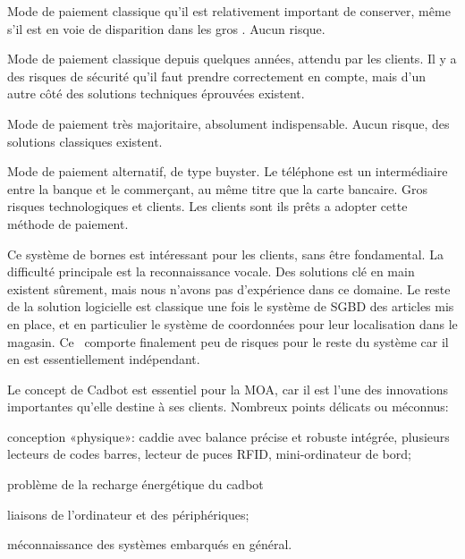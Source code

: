 \startnote
{} Mode de paiement classique qu'il est relativement important de conserver, même s'il est en voie de disparition dans les gros \fm.
 Aucun risque.
\stopnote

\startnote
{} Mode de paiement classique depuis quelques années, attendu par les clients.
 Il y a des risques de sécurité qu'il faut prendre correctement en compte, mais d'un autre côté des solutions techniques éprouvées existent.
\stopnote

\startnote
{} Mode de paiement très majoritaire, absolument indispensable.
 Aucun risque, des solutions classiques existent.
\stopnote

\startnote
{} Mode de paiement alternatif, de type buyster. Le téléphone est un intermédiaire entre la banque et le commerçant, au même titre que la carte bancaire. 
 Gros risques technologiques et clients. Les clients sont ils prêts a adopter cette méthode de paiement.
\stopnote

\startnote
{} Ce système de bornes est intéressant pour les clients, sans être fondamental.
 La difficulté principale est la reconnaissance vocale. 
Des solutions clé en main existent sûrement, mais nous n'avons pas d'expérience dans ce domaine.
Le reste de la solution logicielle est classique une fois le système de SGBD des articles mis en place, et en particulier le système de coordonnées pour leur localisation dans le magasin.
Ce \cu\ comporte finalement peu de risques pour le reste du système car il en est essentiellement indépendant.
\stopnote

\startnote
{} Le concept de Cadbot est essentiel pour la MOA, car il est l'une des innovations importantes qu'elle destine à ses clients.
 Nombreux points délicats ou méconnus:
\startitemize
\item conception «physique»: caddie avec balance précise et robuste intégrée, plusieurs lecteurs de codes barres, lecteur de puces RFID, mini-ordinateur de bord;
\item problème de la recharge énergétique du cadbot
\item liaisons de l'ordinateur et des périphériques;
\item méconnaissance des systèmes embarqués en général.
\stopitemize
\stopnote


